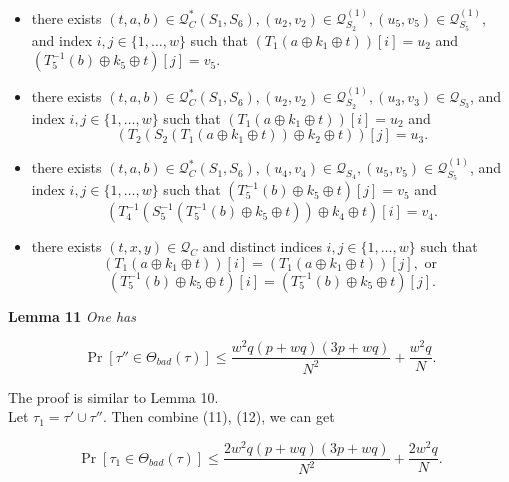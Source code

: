 \begin{itemize}
  \item[\feai]
  there exists $(t, a, b) \in \mathcal{Q}_{C}^{*}\left(S_{1}, S_{6}\right), \left(u_{2}, v_{2}\right) \in \mathcal{Q}_{S_{2}}^{(1)}, \left(u_{5}, v_{5}\right) \in \mathcal{Q}_{S_{5}}^{(1)}$, and index $i, j \in \{1, \ldots, w\}$ such that $(T_1\left(a \oplus k_{1} \oplus t\right))[i]=u_2$ and $(T_5^{-1}\left(b\right) \oplus k_{5} \oplus t)[j]=v_5$.
  \item[\feaii]
  there exists $(t, a, b) \in \mathcal{Q}_{C}^{*}\left(S_{1}, S_{6}\right), \left(u_{2}, v_{2}\right) \in \mathcal{Q}_{S_{2}}^{(1)}, \left(u_{3}, v_{3}\right) \in \mathcal{Q}_{S_{3}}$, and index $i, j \in \{1, \ldots, w\}$ such that $(T_1\left(a \oplus k_{1} \oplus t\right))[i]=u_2$ and 
  $$
  \left(T_{2}\left(S_{2}\left(T_1(a \oplus k_{1} \oplus t)\right) \oplus k_{2} \oplus t\right)\right)[j]=u_3.
  $$
  \item[\feaiii]
  there exists $(t, a, b) \in \mathcal{Q}_{C}^{*}\left(S_{1}, S_{6}\right), \left(u_{4}, v_{4}\right) \in \mathcal{Q}_{S_{4}}, \left(u_{5}, v_{5}\right) \in \mathcal{Q}_{S_{5}}^{(1)}$, and index $i, j \in \{1, \ldots, w\}$ such that $(T_5^{-1}\left(b\right) \oplus k_{5} \oplus t)[j]=v_5$ and 
  $$
  \left(T_{4}^{-1}\left(S_{5}^{-1}\left(T_5^{-1}(b) \oplus k_{5} \oplus t\right)\right) \oplus k_{4} \oplus t\right)[i]=v_4.
  $$
  \item[\feaiv]
  there exists $(t, x, y) \in \mathcal{Q}_{C}$ and distinct indices $i, j \in \{1, \ldots, w\}$ such that 
  $$(T_1\left(a \oplus k_{1} \oplus t\right))[i]=(T_1\left(a \oplus k_{1} \oplus t\right))[j], \text{ or }$$
  $$(T_5^{-1}\left(b\right) \oplus k_{5} \oplus t)[i]=(T_5^{-1}\left(b\right) \oplus k_{5} \oplus t)[j].$$
\end{itemize}

\noindent \textbf{Lemma 11} \emph{One has}

\begin{equation}
\operatorname{Pr}[\tau'' \in \Theta_{bad}(\tau)] \leq \frac{w^2 q (p+w q) (3 p +w q)}{N^{2}} + \frac{w^{2} q}{N}.
\end{equation}

\noindent The proof is similar to Lemma 10.\\

Let $\tau_{1} = \tau' \cup \tau''$. Then combine (11), (12), we can get

\begin{equation}
\operatorname{Pr}[\tau_{1} \in \Theta_{bad}(\tau)] \leq \frac{2w^2 q (p+w q) (3 p +w q)}{N^{2}} + \frac{2w^{2} q}{N}.
\end{equation}


